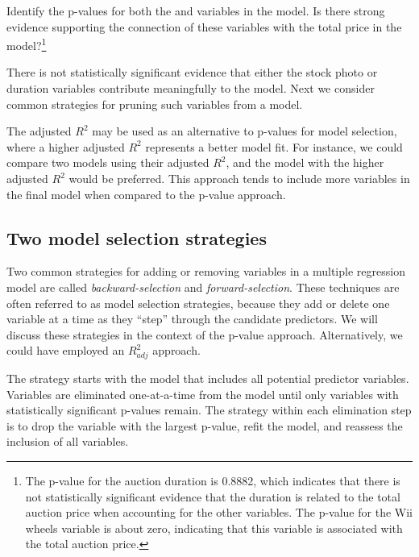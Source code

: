 \begin{exercise}
Identify the p-values for both the  and  variables in the model. Is there strong evidence supporting the connection of these variables with the total price in the model?\footnote{The p-value for the auction duration is 0.8882, which indicates that there is not statistically significant evidence that the duration is related to the total auction price when accounting for the other variables. The p-value for the Wii wheels variable is about zero, indicating that this variable is associated with the total auction price.}
\end{exercise}

There is not statistically significant evidence that either the stock photo or duration variables contribute meaningfully to the model. Next we consider common strategies for pruning such variables from a model.

\begin{tipBox}{
The adjusted $R^2$ may be used as an alternative to p-values for model selection, where a higher adjusted $R^2$ represents a better model fit. For instance, we could compare two models using their adjusted $R^2$, and the model with the higher adjusted $R^2$ would be preferred. This approach tends to include more variables in the final model when compared to the p-value approach.}
\end{tipBox}


\subsection{Two model selection strategies}

Two common strategies for adding or removing variables in a multiple regression model are called \emph{backward-selection} and \emph{forward-selection}. These techniques are often referred to as  model selection strategies, because they add or delete one variable at a time as they ``step'' through the candidate predictors. We will discuss these strategies in the context of the p-value approach. Alternatively, we could have employed an $R_{adj}^2$ approach.

The  strategy starts with the model that includes all potential predictor variables. Variables are eliminated one-at-a-time from the model until only variables with statistically significant p-values remain. The strategy within each elimination step is to drop the variable with the largest p-value, refit the model, and reassess the inclusion of all variables.

